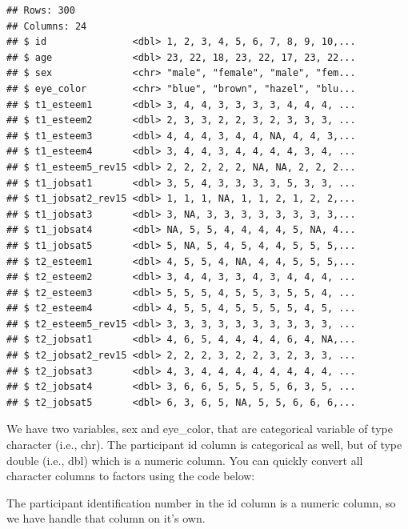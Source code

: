 \documentclass[
]{krantz}
\makeatletter
\newenvironment{Shaded}{\begin{snugshade}}{\end{snugshade}}
\newcommand{\DataTypeTok}[1]{\textcolor[rgb]{0.27,0.27,0.27}{#1}}
\newcommand{\KeywordTok}[1]{\textcolor[rgb]{0.27,0.27,0.27}{\textbf{#1}}}
\newcommand{\NormalTok}[1]{#1}
\newcommand{\OperatorTok}[1]{\textcolor[rgb]{0.43,0.43,0.43}{\textbf{#1}}}
\newcommand{\StringTok}[1]{\textcolor[rgb]{0.5,0.5,0.5}{#1}}
\newenvironment{kframe}{%
\medskip{}
\setlength{\fboxsep}{.8em}
 \def\at@end@of@kframe{}%
 \ifinner\ifhmode%
  \def\at@end@of@kframe{\end{minipage}}%
  \begin{minipage}{\columnwidth}%
 \fi\fi%
 \def\FrameCommand##1{\hskip\@totalleftmargin \hskip-\fboxsep
 \colorbox{shadecolor}{##1}\hskip-\fboxsep
     \hskip-\linewidth \hskip-\@totalleftmargin \hskip\columnwidth}%
 \MakeFramed {\advance\hsize-\width
   \@totalleftmargin\z@ \linewidth\hsize
   \@setminipage}}%
 {\par\unskip\endMakeFramed%
 \at@end@of@kframe}
\renewenvironment{Shaded}{\begin{kframe}}{\end{kframe}}
\makeatother
\begin{document}
\begin{verbatim}
## Rows: 300
## Columns: 24
## $ id               <dbl> 1, 2, 3, 4, 5, 6, 7, 8, 9, 10,...
## $ age              <dbl> 23, 22, 18, 23, 22, 17, 23, 22...
## $ sex              <chr> "male", "female", "male", "fem...
## $ eye_color        <chr> "blue", "brown", "hazel", "blu...
## $ t1_esteem1       <dbl> 3, 4, 4, 3, 3, 3, 3, 4, 4, 4, ...
## $ t1_esteem2       <dbl> 2, 3, 3, 2, 2, 3, 2, 3, 3, 3, ...
## $ t1_esteem3       <dbl> 4, 4, 4, 3, 4, 4, NA, 4, 4, 3,...
## $ t1_esteem4       <dbl> 3, 4, 4, 3, 4, 4, 4, 4, 3, 4, ...
## $ t1_esteem5_rev15 <dbl> 2, 2, 2, 2, 2, NA, NA, 2, 2, 2...
## $ t1_jobsat1       <dbl> 3, 5, 4, 3, 3, 3, 3, 5, 3, 3, ...
## $ t1_jobsat2_rev15 <dbl> 1, 1, 1, NA, 1, 1, 2, 1, 2, 2,...
## $ t1_jobsat3       <dbl> 3, NA, 3, 3, 3, 3, 3, 3, 3, 3,...
## $ t1_jobsat4       <dbl> NA, 5, 5, 4, 4, 4, 4, 5, NA, 4...
## $ t1_jobsat5       <dbl> 5, NA, 5, 4, 5, 4, 4, 5, 5, 5,...
## $ t2_esteem1       <dbl> 4, 5, 5, 4, NA, 4, 4, 5, 5, 5,...
## $ t2_esteem2       <dbl> 3, 4, 4, 3, 3, 4, 3, 4, 4, 4, ...
## $ t2_esteem3       <dbl> 5, 5, 5, 4, 5, 5, 3, 5, 5, 4, ...
## $ t2_esteem4       <dbl> 4, 5, 5, 4, 5, 5, 5, 5, 4, 5, ...
## $ t2_esteem5_rev15 <dbl> 3, 3, 3, 3, 3, 3, 3, 3, 3, 3, ...
## $ t2_jobsat1       <dbl> 4, 6, 5, 4, 4, 4, 4, 6, 4, NA,...
## $ t2_jobsat2_rev15 <dbl> 2, 2, 2, 3, 2, 2, 3, 2, 3, 3, ...
## $ t2_jobsat3       <dbl> 4, 3, 4, 4, 4, 4, 4, 4, 4, 4, ...
## $ t2_jobsat4       <dbl> 3, 6, 6, 5, 5, 5, 5, 6, 3, 5, ...
## $ t2_jobsat5       <dbl> 6, 3, 6, 5, NA, 5, 5, 6, 6, 6,...
\end{verbatim}

We have two variables, sex and eye\_color, that are categorical variable of type character (i.e., chr). The participant id column is categorical as well, but of type double (i.e., dbl) which is a numeric column. You can quickly convert all character columns to factors using the code below:

\begin{Shaded}
\end{Shaded}

The participant identification number in the id column is a numeric column, so we have handle that column on it's own.
\end{document}
